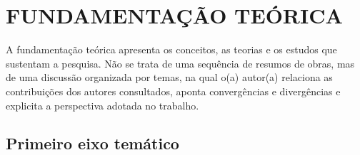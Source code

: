 
\chapter{FUNDAMENTAÇÃO TEÓRICA}
\label{cap:fundamentacao}

A fundamentação teórica apresenta os conceitos, as teorias e os estudos que sustentam a pesquisa. Não se trata de uma sequência de resumos de obras, mas de uma discussão organizada por temas, na qual o(a) autor(a) relaciona as contribuições dos autores consultados, aponta convergências e divergências e explicita a perspectiva adotada no trabalho.

\section{Primeiro eixo temático}
\label{sec:eixo1}

